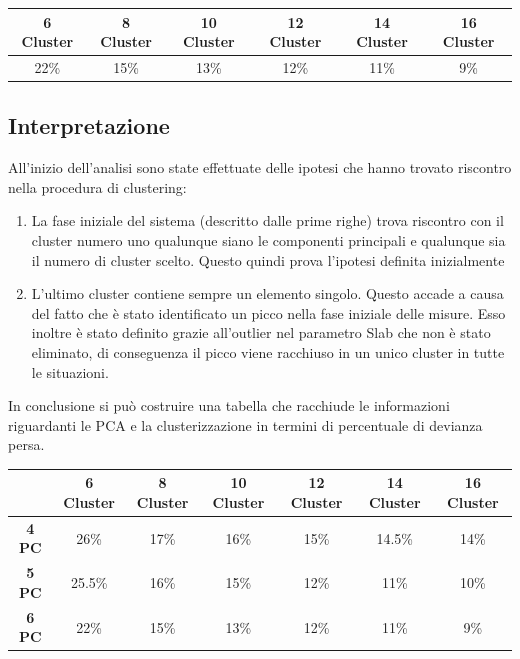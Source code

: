  
 \begin{center}
 	\begin{tabular}{|c|c|c|c|c|c|}
 		\hline
 		\textbf{6 Cluster} & \textbf{8 Cluster} & \textbf{10 Cluster} &\textbf{12 Cluster}& \textbf{14 Cluster} & \textbf{16 Cluster} \\
 		\hline
 		22\% & 15\%& 13\% & 12\% & 11\% & 9\% \\
 		\hline
 	\end{tabular}
 \end{center}

\vspace{0.5cm}

\subsection{Interpretazione}
All'inizio dell'analisi sono state effettuate delle ipotesi che hanno trovato riscontro nella procedura di clustering:
\begin{enumerate}
	\item La fase iniziale del sistema (descritto dalle prime righe) trova riscontro con il cluster numero uno qualunque siano le componenti principali e qualunque sia il numero di cluster scelto. Questo quindi prova l'ipotesi definita inizialmente
	\item L'ultimo cluster contiene sempre un elemento singolo. Questo accade a causa del fatto che è stato identificato un picco nella fase iniziale delle misure. Esso inoltre è stato definito grazie all'outlier nel parametro Slab che non è stato eliminato, di conseguenza il picco viene racchiuso in un unico cluster in tutte le situazioni.
\end{enumerate}
\vspace{0.5cm}
In conclusione si può costruire una tabella che racchiude le informazioni riguardanti le PCA e la clusterizzazione in termini di percentuale di devianza persa.
 \begin{center}
	\begin{tabular}{|c|c|c|c|c|c|c|}
		\hline
		& \textbf{6 Cluster} & \textbf{8 Cluster} & \textbf{10 Cluster} &\textbf{12 Cluster}& \textbf{14 Cluster} & \textbf{16 Cluster} \\
		\hline
		\textbf{4 PC} & 26\%& 17\% & 16\% & 15\% & 14.5\% & 14\% \\

	\textbf{5 PC} & 25.5\%& 16\% & 15\% & 12\% & 11\% & 10\% \\

		\textbf{6 PC} & 22\% & 15\%& 13\% & 12\% & 11\% & 9\% \\
		\hline
	\end{tabular}
\end{center}

